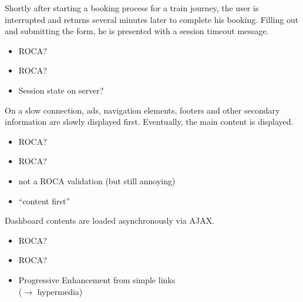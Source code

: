 \documentclass{beamer}
\newcommand{\rocaok}{\ding{51}}
\newcommand{\rocafail}{\ding{55}}
\begin{document}
\begin{frame}
  Shortly after starting a booking process for a train journey, the user is
  interrupted and returns several minutes later to complete his booking. Filling
  out and submitting the form, he is presented with a session timeout message.

  \vspace{0.3cm}
  \begin{itemize}
    \item<1|only@1>[\Large $\square$] \Large ROCA?
    \item<2|only@2>[\Large \rocafail] \Large ROCA?
    \item<2> Session state on server?
  \end{itemize}

\end{frame}

\begin{frame}
  On a slow connection, ads, navigation elements, footers and other secondary
  information are slowly displayed first. Eventually, the main content is displayed.

  \vspace{0.3cm}
  \begin{itemize}
    \item<1|only@1>[\Large $\square$] \Large ROCA?
    \item<2|only@2>[\Large ?] \Large ROCA?
    \item<2> not a ROCA validation (but still annoying)
    \item<2> ``content first''
  \end{itemize}

\end{frame}

\begin{frame}
  Dashboard contents are loaded asynchronously via AJAX.

  \vspace{0.3cm}
  \begin{itemize}
    \item<1|only@1>[\Large $\square$] \Large ROCA?
    \item<2|only@2>[\Large \rocaok] \Large ROCA?
    \item<2> Progressive Enhancement from simple links \\ (\ensuremath{\rightarrow} hypermedia)
  \end{itemize}

\end{frame}
\end{document}
